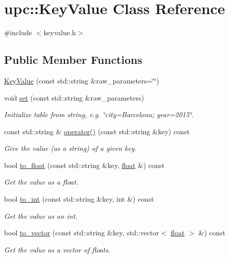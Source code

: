\hypertarget{classupc_1_1KeyValue}{}\section{upc\+:\+:Key\+Value Class Reference}
\label{classupc_1_1KeyValue}


{\ttfamily \#include $<$keyvalue.\+h$>$}

\subsection*{Public Member Functions}
\begin{DoxyCompactItemize}
\item 
\hyperlink{classupc_1_1KeyValue_a16e43218b2cdf234929ad76c6a28de51}{Key\+Value} (const std\+::string \&raw\+\_\+parameters=\char`\"{}\char`\"{})
\item 
void \hyperlink{classupc_1_1KeyValue_aff88fb11aa97cd85fa0b398e34ed763a}{set} (const std\+::string \&raw\+\_\+parameters)
\begin{DoxyCompactList}\small\item\em Initialize table from string, e.\+g. \char`\"{}city=\+Barcelona; year=2015\char`\"{}. \end{DoxyCompactList}\item 
const std\+::string \& \hyperlink{classupc_1_1KeyValue_a26cd081e33ed9d29937a266688f250eb}{operator()} (const std\+::string \&key) const 
\begin{DoxyCompactList}\small\item\em Give the value (as a string) of a given key. \end{DoxyCompactList}\item 
bool \hyperlink{classupc_1_1KeyValue_ab0e78c55886853b14ed0b0a12d54ffe8}{to\+\_\+float} (const std\+::string \&key, \hyperlink{FFTReal__readme_8txt_a0ea2fae2a8106200bf378b90eae003cf}{float} \&) const 
\begin{DoxyCompactList}\small\item\em Get the value as a float. \end{DoxyCompactList}\item 
bool \hyperlink{classupc_1_1KeyValue_aec285f4f4eb0eb6dda44c15138f4a3d9}{to\+\_\+int} (const std\+::string \&key, int \&) const 
\begin{DoxyCompactList}\small\item\em Get the value as an int. \end{DoxyCompactList}\item 
bool \hyperlink{classupc_1_1KeyValue_a8413af4543c0103f01a4bf2c7e480650}{to\+\_\+vector} (const std\+::string \&key, std\+::vector$<$ \hyperlink{FFTReal__readme_8txt_a0ea2fae2a8106200bf378b90eae003cf}{float} $>$ \&) const 
\begin{DoxyCompactList}\small\item\em Get the value as a vector of floats. \end{DoxyCompactList}\end{DoxyCompactItemize}
